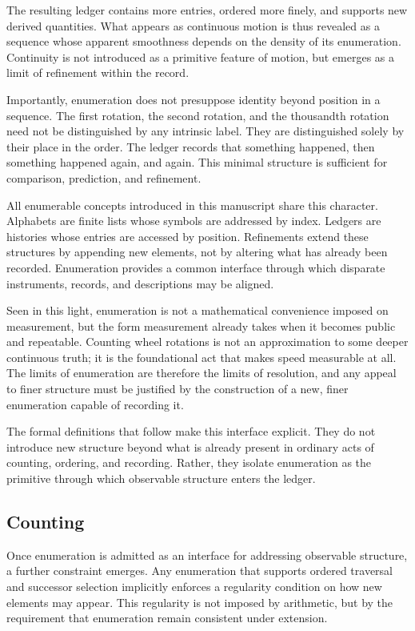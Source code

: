 The resulting ledger contains more entries, ordered more finely, and supports
new derived quantities. What appears as continuous motion is thus revealed as a
sequence whose apparent smoothness depends on the density of its enumeration.
Continuity is not introduced as a primitive feature of motion, but emerges as a
limit of refinement within the record.


Importantly, enumeration does not presuppose identity beyond position in a
sequence. The first rotation, the second rotation, and the thousandth rotation
need not be distinguished by any intrinsic label. They are distinguished solely
by their place in the order. The ledger records that something happened, then
something happened again, and again. This minimal structure is sufficient for
comparison, prediction, and refinement.

All enumerable concepts introduced in this manuscript share this character.
Alphabets are finite lists whose symbols are addressed by index. Ledgers are
histories whose entries are accessed by position. Refinements extend these
structures by appending new elements, not by altering what has already been
recorded. Enumeration provides a common interface through which disparate
instruments, records, and descriptions may be aligned.

Seen in this light, enumeration is not a mathematical convenience imposed on
measurement, but the form measurement already takes when it becomes public and
repeatable. Counting wheel rotations is not an approximation to some deeper
continuous truth; it is the foundational act that makes speed measurable at all.
The limits of enumeration are therefore the limits of resolution, and any appeal
to finer structure must be justified by the construction of a new, finer
enumeration capable of recording it.

The formal definitions that follow make this interface explicit. They do not
introduce new structure beyond what is already present in ordinary acts of
counting, ordering, and recording. Rather, they isolate enumeration as the
primitive through which observable structure enters the ledger.


\subsection{Counting}
\label{subsec:peano-effect}

Once enumeration is admitted as an interface for addressing observable
structure, a further constraint emerges.  Any enumeration that supports ordered
traversal and successor selection implicitly enforces a regularity condition on
how new elements may appear.  This regularity is not imposed by arithmetic, but
by the requirement that enumeration remain consistent under extension.

